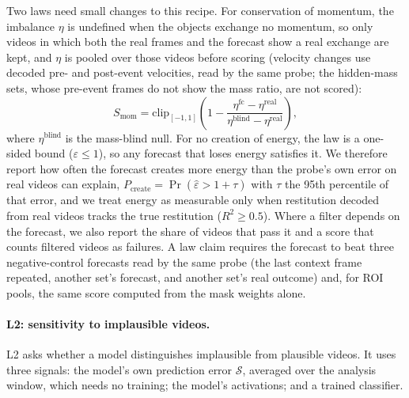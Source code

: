 \documentclass[10pt]{article}
\newcommand{\eps}{\varepsilon}
\begin{document}
Two laws need small changes to this recipe. For conservation of momentum, the imbalance $\eta$ is undefined when the
objects exchange no momentum, so only videos in which both the real frames and the forecast show a real exchange are
kept, and $\eta$ is pooled over those videos before scoring (velocity changes use decoded pre- and post-event
velocities, read by the same probe; the hidden-mass sets, whose pre-event frames do not show the mass ratio, are not scored):
\[
S_{\mathrm{mom}}=\mathrm{clip}_{[-1,1]}\!\left(1-\frac{\eta^{\mathrm{fc}}-\eta^{\mathrm{real}}}{\eta^{\mathrm{blind}}-\eta^{\mathrm{real}}}\right),
\]
where $\eta^{\mathrm{blind}}$ is the mass-blind null. For no creation of energy, the law is a one-sided bound
($\eps\le1$), so any forecast that loses energy satisfies it. We therefore report how often the forecast creates more
energy than the probe's own error on real videos can explain, $P_{\mathrm{create}}=\Pr(\hat\eps>1+\tau)$ with $\tau$
the 95th percentile of that error, and we treat energy as measurable only when restitution decoded from real videos
tracks the true restitution ($R^2\ge0.5$). Where a filter depends on the forecast, we also report the share of videos
that pass it and a score that counts filtered videos as failures. A law claim requires the forecast to beat three
negative-control forecasts read by the same probe (the last context frame repeated, another set's forecast, and
another set's real outcome) and, for ROI pools, the same score computed from the mask weights alone.

\paragraph{L2: sensitivity to implausible videos.}
L2 asks whether a model distinguishes implausible from plausible videos. It uses three signals: the model's own
prediction error $\mathcal S$, averaged over the analysis window, which needs no training; the model's activations;
and a trained classifier.
\end{document}
